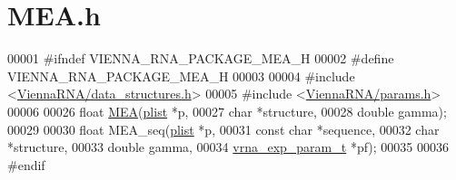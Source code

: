 \hypertarget{MEA_8h_source}{}\section{M\+E\+A.\+h}
\label{MEA_8h_source}

\begin{DoxyCode}
00001 \textcolor{preprocessor}{#ifndef VIENNA\_RNA\_PACKAGE\_MEA\_H}
00002 \textcolor{preprocessor}{#define VIENNA\_RNA\_PACKAGE\_MEA\_H}
00003 
00004 \textcolor{preprocessor}{#include <\hyperlink{data__structures_8h}{ViennaRNA/data\_structures.h}>}
00005 \textcolor{preprocessor}{#include <\hyperlink{params_8h}{ViennaRNA/params.h}>}
00006 
00026 \textcolor{keywordtype}{float} \hyperlink{group__mea__fold_ga396ec6144c6a74fcbab4cea6b42d76c3}{MEA}(\hyperlink{group__data__structures_structvrna__plist__s}{plist} *p,
00027           \textcolor{keywordtype}{char} *structure,
00028           \textcolor{keywordtype}{double} gamma);
00029 
00030 \textcolor{keywordtype}{float} MEA\_seq(\hyperlink{group__data__structures_structvrna__plist__s}{plist} *p,
00031               \textcolor{keyword}{const} \textcolor{keywordtype}{char} *sequence,
00032               \textcolor{keywordtype}{char} *structure,
00033               \textcolor{keywordtype}{double} gamma,
00034               \hyperlink{group__energy__parameters_structvrna__exp__param__s}{vrna\_exp\_param\_t} *pf);
00035 
00036 \textcolor{preprocessor}{#endif}
\end{DoxyCode}
